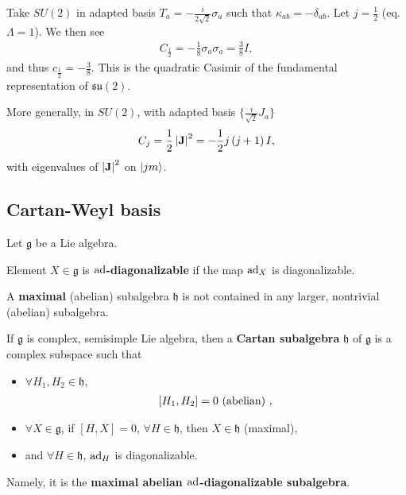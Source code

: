 \begin{example}
    Take $SU \left( 2 \right) $ in adapted basis $T_{a} = -\frac{i}{2\sqrt{2} } \sigma_a$ such that $\kappa_{ab} = -\delta_{ab}$. Let $j = \frac{1}{2}$ (eq. $\Lambda = 1$). We then see
    \begin{align}
        C_{\frac{1}{2}} = -\frac{1}{8} \sigma_a \sigma_a = \frac{3}{8} I
    ,\end{align}
    and thus $c_{\frac{1}{2}} = -\frac{3}{8}$. This is the quadratic Casimir of the fundamental representation of $\mathfrak{su}\left( 2 \right) $.
\end{example}

More generally, in $SU \left( 2 \right) $, with adapted basis $\{\frac{i}{\sqrt{2} }J_a\} $
\begin{align}
    C_j = \frac{1}{2} \left| \vb{J} \right|^2 = -\frac{1}{2} j \left( j + 1 \right)  I
,\end{align}
with eigenvalues of $\left| \vb{J} \right|^2$ on $\ket{jm}$.

\subsection{Cartan-Weyl basis}

Let $\mathfrak{g}$ be a Lie algebra. 

\begin{definition}
  Element $X \in \mathfrak{g}$ is \textbf{$\text{ad}$-diagonalizable} if the map $\text{ad}_X$ is diagonalizable.  
\end{definition}

\begin{definition}
    A \textbf{maximal} (abelian) subalgebra $\mathfrak{h}$ is not contained in any larger, nontrivial (abelian) subalgebra.
\end{definition}

\begin{definition}
    If $\mathfrak{g}$ is complex, semisimple Lie algebra, then a \textbf{Cartan subalgebra} $\mathfrak{h}$ of $\mathfrak{g}$ is a complex subspace such that 
    \begin{itemize}
        \item $\forall  H_1, H_2 \in \mathfrak{h}$,
    \begin{align}
        \left[ H_1, H_2 \right] = 0 \hfill \text{~(abelian)~}
    ,\end{align}
        \item $\forall X \in \mathfrak{g}$, if $\left[ H, X \right] = 0$, $\forall H \in \mathfrak{h}$, then $X \in \mathfrak{h}$ (maximal),
        \item and $\forall H \in \mathfrak{h}$, $\text{ad}_{H}$ is diagonalizable.
    \end{itemize}

    Namely, it is the \textbf{maximal abelian $\text{ad}$-diagonalizable subalgebra}.
\end{definition}

